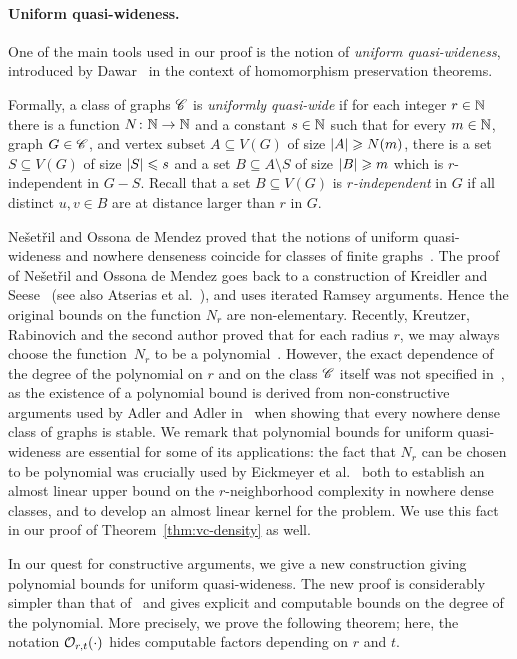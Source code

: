 \paragraph{Uniform quasi-wideness.}
One of the main tools used in our proof 
is the notion of \emph{uniform quasi-wideness},
introduced by Dawar~\cite{dawar2010homomorphism}
in the context of homomorphism preservation theorems.

Formally, a class of graphs $\mathscr{C}$  is \emph{uniformly quasi-wide} if for each integer $r\in\mathbb{N}$ there is a function
 $N\colon \mathbb{N}\rightarrow \mathbb{N}$ and a constant  $s\in \mathbb{N}$ such
that for every $m\in \mathbb{N}$, graph $G\in \mathscr{C}$, and vertex subset $A\subseteq V(G)$ of size $\left\lvert A\right\rvert\geqslant N(m)$,
there is a set $S\subseteq V(G)$ of size $\left\lvert S\right\rvert\leqslant s$ and a set
$B\subseteq A\setminus S$ of size $\left\lvert B\right\rvert\geqslant m$ which is $r$-independent in
$G-S$. Recall that a set $B\subseteq V(G)$ is {\em{$r$-independent}} in $G$ if all
distinct $u,v\in B$ are at distance 
larger than $r$ in $G$.

Ne\v{s}et\v{r}il and Ossona de Mendez proved that
the notions of uniform quasi-wideness and nowhere denseness coincide for 
classes of finite graphs~\cite{nevsetvril2011nowhere}. 
The proof of Ne\v{s}et\v{r}il 
and Ossona de Mendez goes back to a construction
of Kreidler and Seese~\cite{kreidler1998monadic} (see also Atserias et al.~\cite{atserias2006preservation}), 
and uses iterated Ramsey arguments. Hence the original bounds on 
the function $N_r$ are non-elementary. Recently, Kreutzer, Rabinovich and the second author
 proved that for each radius $r$, we may always choose the function~$N_r$ to be a polynomial~\cite{siebertz2016polynomial}. 
 However, the exact dependence of the degree of the polynomial on $r$ and on the class $\mathscr{C}$ itself
 was not specified in~\cite{siebertz2016polynomial}, as the existence of a polynomial bound is derived
from non-constructive arguments used by Adler and Adler in~\cite{adler2014interpreting} when showing that every nowhere dense class of graphs
is stable. We remark that polynomial bounds for uniform quasi-wideness are essential for some of its applications:
the fact that $N_r$ can be chosen to be polynomial was crucially used by Eickmeyer et al.~\cite{eickmeyer2016neighborhood} both to establish an almost linear upper bound on the
$r$-neighborhood complexity in nowhere dense classes, and to develop an almost linear kernel for the {} problem.
We use this fact in our proof of Theorem~\ref{thm:vc-density} as well.

In our quest for constructive arguments, we give a new construction giving polynomial bounds for uniform quasi-wideness.
The new proof is considerably simpler than that of~\cite{siebertz2016polynomial}
and gives explicit and computable bounds on the degree of the polynomial.
More precisely, we prove the following theorem; here, the notation $\mathcal{O}_{r,t}(\cdot)$ hides computable factors depending on $r$ and $t$.

